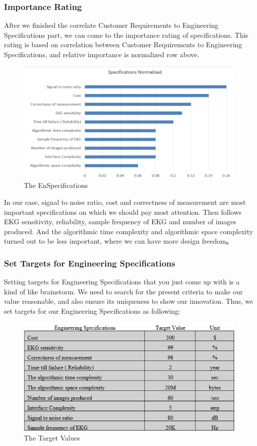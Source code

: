 \documentclass[paper=letter, fontsize=11pt]{scrartcl}
\numberwithin{equation}{section}		%
\numberwithin{figure}{section}			%
\numberwithin{table}{section}			%
\begin{document}
\subsubsection{Importance Rating}
After we finished the correlate Customer Requirements to Engineering Specifications part, we can come to the importance rating of specifications. This rating is based on correlation between Customer Requirements to Engineering Specifications, and relative importance is normalized row above. 

\begin{figure}[H]
    \centering
	\includegraphics[scale=1]{zhentmfan.png}
	\caption{The EnSpecifications}
\end{figure}

In our case, signal to noise ratio, cost and correctness of measurement are most important specifications on which we should pay most attention. Then follows EKG sensitivity, reliability, sample frequency of EKG and number of images produced. And the algorithmic time complexity and algorithmic space complexity turned out to be less important, where we can have more design freedom。
\subsubsection{Set Targets for Engineering Specifications}
Setting targets for Engineering Specifications that you just come up with is a kind of like brainstorm. We need to search for the present criteria to make our value reasonable, and also ensure its uniqueness to show our innovation. Thus, we set targets for our Engineering Specifications as following:

\begin{figure}[H]
	\centering
	\includegraphics[scale=1]{target.png}
	\caption{The Target Values}
\end{figure}
\end{document}
